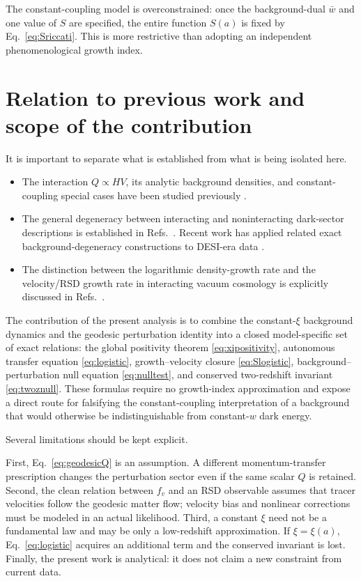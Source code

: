 \documentclass[11pt]{article}
\theoremstyle{remark}
\begin{document}
The constant-coupling model is overconstrained: once the background-dual $\bar w$ and one value of $S$ are specified, the entire function $S(a)$ is fixed by Eq.~\eqref{eq:Sriccati}.  This is more restrictive than adopting an independent phenomenological growth index.

\section{Relation to previous work and scope of the contribution}
\label{sec:prior}

It is important to separate what is established from what is being isolated here.

\begin{itemize}[leftmargin=2em]
    \item The interaction $Q\propto HV$, its analytic background densities, and constant-coupling special cases have been studied previously \cite{Martinelli2019,BorgesWands2020,Yang2021,Kaeonikhom2023}.
    \item The general degeneracy between interacting and noninteracting dark-sector descriptions is established in Refs.~\cite{Kunz2009,Aviles2011,vonMarttens2020}.  Recent work has applied related exact background-degeneracy constructions to DESI-era data \cite{Petri2026}.
    \item The distinction between the logarithmic density-growth rate and the velocity/RSD growth rate in interacting vacuum cosmology is explicitly discussed in Refs.~\cite{BorgesWands2020,Kaeonikhom2023}.
\end{itemize}

The contribution of the present analysis is to combine the constant-$\xi$ background dynamics and the geodesic perturbation identity into a closed model-specific set of exact relations: the global positivity theorem \eqref{eq:xipositivity}, autonomous transfer equation \eqref{eq:logistic}, growth--velocity closure \eqref{eq:Slogistic}, background--perturbation null equation \eqref{eq:nulltest}, and conserved two-redshift invariant \eqref{eq:twoznull}.  These formulas require no growth-index approximation and expose a direct route for falsifying the constant-coupling interpretation of a background that would otherwise be indistinguishable from constant-$w$ dark energy.

Several limitations should be kept explicit.

First, Eq.~\eqref{eq:geodesicQ} is an assumption.  A different momentum-transfer prescription changes the perturbation sector even if the same scalar $Q$ is retained.  Second, the clean relation between $f_v$ and an RSD observable assumes that tracer velocities follow the geodesic matter flow; velocity bias and nonlinear corrections must be modeled in an actual likelihood.  Third, a constant $\xi$ need not be a fundamental law and may be only a low-redshift approximation.  If $\xi=\xi(a)$, Eq.~\eqref{eq:logistic} acquires an additional term and the conserved invariant is lost.  Finally, the present work is analytical: it does not claim a new constraint from current data.
\end{document}
